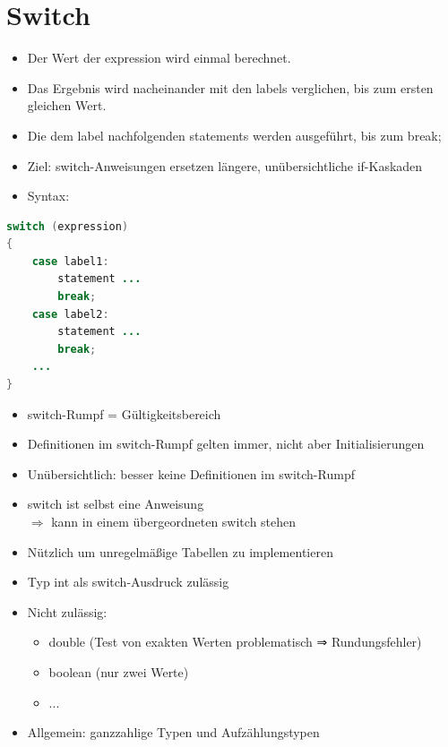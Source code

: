  \section{Switch}
 \begin{itemize}
 \item Der Wert der expression wird einmal berechnet.
\item Das Ergebnis wird nacheinander mit den labels verglichen, bis zum ersten gleichen Wert.
\item  Die dem label nachfolgenden statements werden ausgeführt, bis zum break;
\item Ziel: switch-Anweisungen ersetzen längere, unübersichtliche if-Kaskaden
\item  Syntax:
\end{itemize}
 \begin{lstlisting}[language=JAVA]
switch (expression)
{
	case label1:
		statement ...
		break;
	case label2:
		statement ...
		break;
	...
}
 \end{lstlisting}
\begin{itemize}
\item switch-Rumpf = Gültigkeitsbereich
\item Definitionen im switch-Rumpf gelten immer, nicht aber Initialisierungen
\item Unübersichtlich: besser keine Definitionen im switch-Rumpf
\item switch ist selbst eine Anweisung\\
$\Rightarrow$ kann in einem übergeordneten switch stehen
\item Nützlich um unregelmäßige Tabellen zu implementieren
\item Typ int als switch-Ausdruck zulässig
\item Nicht zulässig:
\begin{itemize}
	\item double (Test von exakten Werten problematisch ⇒ Rundungsfehler)
	\item boolean (nur zwei Werte)
	\item ...
\end{itemize}
\item Allgemein: ganzzahlige Typen und Aufzählungstypen
\end{itemize}

